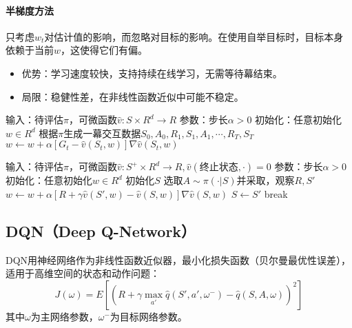 \documentclass[
12pt, %
a4paper, 
oneside, %
headinclude,footinclude, %
]{scrartcl}
\begin{document}
\paragraph{半梯度方法}
只考虑$ w_t $对估计值的影响，而忽略对目标的影响。在使用自举目标时，目标本身依赖于当前$ w $，这使得它们有偏。
\begin{itemize}
\item 优势：学习速度较快，支持持续在线学习，无需等待幕结束。
\item 局限：稳健性差，在非线性函数近似中可能不稳定。
\end{itemize}
\begin{myalgorithm}[梯度蒙特卡洛]
\State 输入：待评估$ \pi $，可微函数$ \hat{v}:S \times R^d \to R $
\State 参数：步长$ \alpha > 0 $
\State 初始化：任意初始化$ w \in R^d $
\Loop {}
\State 根据$ \pi $生成一幕交互数据$ S_0, A_0, R_1, S_1, A_1, \cdots, R_T, S_T $
\State $ w \gets w + \alpha[G_t - \hat{v}(S_t, w)]\nabla\hat{v}(S_t, w)$
\EndFor
\EndLoop
\end{myalgorithm}
\begin{myalgorithm}[半梯度TD(0)]
\State 输入：待评估$ \pi $，可微函数$ \hat{v}:S^+ \times R^d \to R, \hat{v}(\text{终止状态}, \cdot) = 0 $
\State 参数：步长$ \alpha > 0 $
\State 初始化：任意初始化$ w \in R^d $
\Loop {}
\State 初始化$ S $
\State 选取$ A \sim \pi(\cdot|S) $并采取，观察$ R,S' $
\State $ w \gets w + \alpha[R + \gamma\hat{v}(S', w) - \hat{v}(S, w)]\nabla\hat{v}(S, w) $
\State $ S \gets S' $
\State break
\EndIf
\EndFor
\EndLoop
\end{myalgorithm}
\subsection{DQN（Deep Q-Network）}
DQN用神经网络作为非线性函数近似器，最小化损失函数（贝尔曼最优性误差），适用于高维空间的状态和动作问题：
$$ J(\omega) = E[(R + \gamma \max_{a'} \hat{q}(S', a', \omega^-) - \hat{q}(S, A, \omega))^2] $$
其中$ \omega $为主网络参数，$ \omega^- $为目标网络参数。
\end{document}
